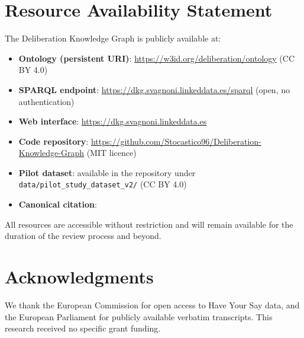 \documentclass[sigconf,natbib]{acmart}
\begin{document}
\section*{Resource Availability Statement}
\noindent
The Deliberation Knowledge Graph is publicly available at:
\begin{itemize}
  \item \textbf{Ontology (persistent URI)}: \url{https://w3id.org/deliberation/ontology} (CC BY 4.0)
  \item \textbf{SPARQL endpoint}: \url{https://dkg.svagnoni.linkeddata.es/sparql} (open, no authentication)
  \item \textbf{Web interface}: \url{https://dkg.svagnoni.linkeddata.es}
  \item \textbf{Code repository}: \url{https://github.com/Stocastico96/Deliberation-Knowledge-Graph} (MIT licence)
  \item \textbf{Pilot dataset}: available in the repository under \texttt{data/pilot\_study\_dataset\_v2/} (CC BY 4.0)
  \item \textbf{Canonical citation}: \citet{Vagnoni2026}
\end{itemize}
All resources are accessible without restriction and will remain available for the duration of the review process and beyond.

\section*{Acknowledgments}
We thank the European Commission for open access to Have Your Say data, and the European Parliament for publicly available verbatim transcripts. This research received no specific grant funding.
\end{document}
